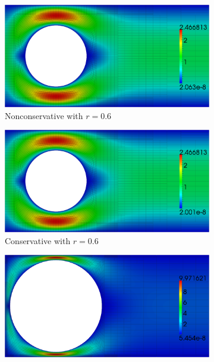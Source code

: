 \documentclass[letterpaper]{article}
\begin{document}
\begin{figure}[p]
\centering
\begin{subfigure}[t]{0.5\textwidth}
\centering
\includegraphics[width=\textwidth]{figs/StokesCylinder/umag6_NC6.png}
\caption{Nonconservative with $r=0.6$}
\label{fig:stokesCylinderNC6}
\end{subfigure}
\begin{subfigure}[t]{0.5\textwidth}
\centering
\includegraphics[width=\textwidth]{figs/StokesCylinder/umag6_C6.png}
\caption{Conservative with $r=0.6$}
\label{fig:stokesCylinderC6}
\end{subfigure}
\begin{subfigure}[t]{0.5\textwidth}
\centering
\includegraphics[width=\textwidth]{figs/StokesCylinder/umag9_NC6.png}

\end{subfigure}
\end{figure}
\end{document}
